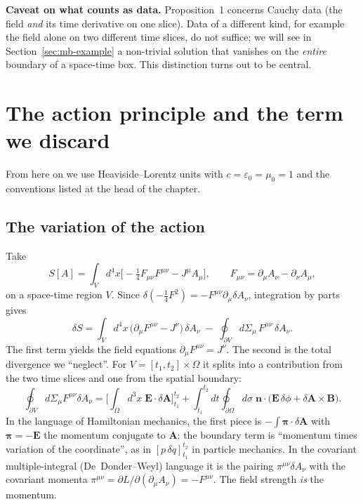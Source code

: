 \medskip
\noindent
\textbf{Caveat on what counts as data.} Proposition~1 concerns Cauchy data
(the field \emph{and} its time derivative on one slice). Data of a different
kind, for example the field alone on two different time slices, do not
suffice; we will see in Section~\ref{sec:mb-example} a non-trivial
solution that vanishes on the \emph{entire} boundary of a space-time box.
This distinction turns out to be central.

\section{The action principle and the term we discard}
\label{sec:mb-action}

From here on we use Heaviside--Lorentz units with $c=\varepsilon_0=\mu_0=1$
and the conventions listed at the head of the chapter.

\subsection{The variation of the action}

Take
\begin{equation}
S[A]=\int_V d^4x\Big[-\tfrac14F_{\mu\nu}F^{\mu\nu}-J^\mu A_\mu\Big],
\qquad F_{\mu\nu}=\partial_\mu A_\nu-\partial_\nu A_\mu ,
\label{eq:mb-action}
\end{equation}
on a space-time region $V$. Since $\delta(-\tfrac14F^2)=-F^{\mu\nu}\partial_\mu\delta A_\nu$,
integration by parts gives
\begin{equation}
\delta S=\int_V d^4x\,\big(\partial_\mu F^{\mu\nu}-J^\nu\big)\,\delta A_\nu
\;-\;\oint_{\partial V}d\Sigma_\mu\,F^{\mu\nu}\,\delta A_\nu .
\label{eq:mb-variation}
\end{equation}
The first term yields the field equations $\partial_\mu F^{\mu\nu}=J^\nu$.
The second is the total divergence we ``neglect''. For
$V=[t_1,t_2]\times\Omega$ it splits into a contribution from the two time
slices and one from the spatial boundary:
\begin{equation}
\oint_{\partial V}\!d\Sigma_\mu F^{\mu\nu}\delta A_\nu
=\Big[\int_\Omega d^3x\;\mathbf E\cdot\delta\mathbf A\Big]_{t_1}^{t_2}
+\int_{t_1}^{t_2}\!dt\oint_{\partial\Omega}\!d\sigma\;
\mathbf n\cdot\big(\mathbf E\,\delta\phi+\delta\mathbf A\times\mathbf B\big).
\label{eq:mb-boundary-split}
\end{equation}
In the language of Hamiltonian mechanics, the first piece is
$-\int\boldsymbol\pi\cdot\delta\mathbf A$ with $\boldsymbol\pi=-\mathbf E$ the
momentum conjugate to $\mathbf A$: the boundary term is ``momentum times
variation of the coordinate'', as in $[p\,\delta q]_{t_1}^{t_2}$ in
particle mechanics. In the covariant multiple-integral (De~Donder--Weyl)
language it is the pairing $\pi^{\mu\nu}\delta A_\nu$ with the covariant
momenta $\pi^{\mu\nu}=\partial L/\partial(\partial_\mu A_\nu)=-F^{\mu\nu}$.
The field strength \emph{is} the momentum.

